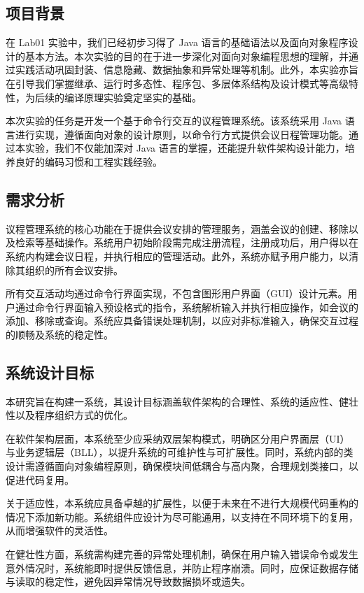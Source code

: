 \documentclass[a4paper, twoside, utf8]{ctexart}
\begin{document}
    \subsection{项目背景}

    在 Lab01 实验中，我们已经初步习得了 Java 语言的基础语法以及面向对象程序设计的基本方法。本次实验的目的在于进一步深化对面向对象编程思想的理解，并通过实践活动巩固封装、信息隐藏、数据抽象和异常处理等机制。此外，本实验亦旨在引导我们掌握继承、运行时多态性、程序包、多层体系结构及设计模式等高级特性，为后续的编译原理实验奠定坚实的基础。

    本次实验的任务是开发一个基于命令行交互的议程管理系统。该系统采用 Java 语言进行实现，遵循面向对象的设计原则，以命令行方式提供会议日程管理功能。通过本实验，我们不仅能加深对 Java 语言的掌握，还能提升软件架构设计能力，培养良好的编码习惯和工程实践经验。

    \subsection{需求分析}

    议程管理系统的核心功能在于提供会议安排的管理服务，涵盖会议的创建、移除以及检索等基础操作。系统用户初始阶段需完成注册流程，注册成功后，用户得以在系统内构建会议日程，并执行相应的管理活动。此外，系统亦赋予用户能力，以清除其组织的所有会议安排。
    
    所有交互活动均通过命令行界面实现，不包含图形用户界面（GUI）设计元素。用户通过命令行界面输入预设格式的指令，系统解析输入并执行相应操作，如会议的添加、移除或查询。系统应具备错误处理机制，以应对非标准输入，确保交互过程的顺畅及系统的稳定性。

    \subsection{系统设计目标}

    本研究旨在构建一系统，其设计目标涵盖软件架构的合理性、系统的适应性、健壮性以及程序组织方式的优化。
    
    在软件架构层面，本系统至少应采纳双层架构模式，明确区分用户界面层（UI）与业务逻辑层（BLL），以提升系统的可维护性与可扩展性。同时，系统内部的类设计需遵循面向对象编程原则，确保模块间低耦合与高内聚，合理规划类接口，以促进代码复用。
    
    关于适应性，本系统应具备卓越的扩展性，以便于未来在不进行大规模代码重构的情况下添加新功能。系统组件应设计为尽可能通用，以支持在不同环境下的复用，从而增强软件的灵活性。
    
    在健壮性方面，系统需构建完善的异常处理机制，确保在用户输入错误命令或发生意外情况时，系统能即时提供反馈信息，并防止程序崩溃。同时，应保证数据存储与读取的稳定性，避免因异常情况导致数据损坏或遗失。
    
\end{document}
